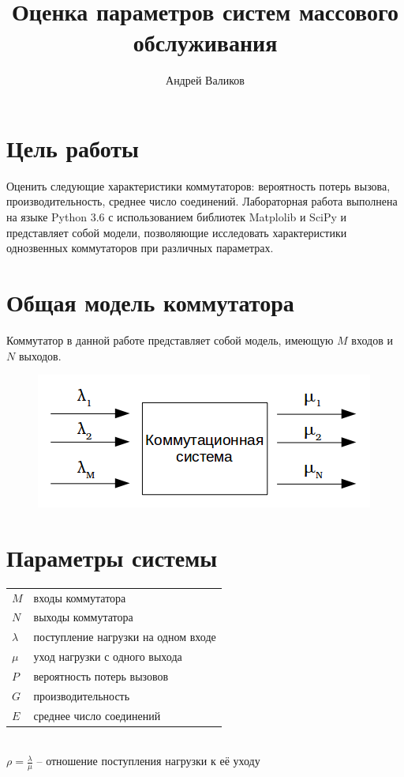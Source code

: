 \documentclass[12pt]{article}
\let\Oldsection\section
\renewcommand{\section}{\FloatBarrier\Oldsection}
\begin{document}
\title{Оценка параметров систем массового обслуживания}
\author{Андрей Валиков}
\date{}
\maketitle

\section{Цель работы}
Оценить следующие характеристики коммутаторов: вероятность потерь вызова, производительность, среднее число соединений. Лабораторная работа выполнена на языке Python 3.6 с использованием библиотек Matplolib и SciPy и представляет собой модели, позволяющие исследовать характеристики однозвенных коммутаторов при различных параметрах.

\section{Общая модель коммутатора}
Коммутатор в данной работе представляет собой модель, имеющую $M$ входов и $N$ выходов.

\begin{figure}[htp]
\centering
\includegraphics[scale=1.00]{assets/comm_model.png}
\end{figure}


\section{Параметры системы}\label{sec:systemParams}

\begin{tabular}{l l}
    $M$ & входы коммутатора \\
    $N$ & выходы коммутатора \\
    $\lambda$ & поступление нагрузки на одном входе \\
    $\mu$ & уход нагрузки с одного выхода \\
    $P$ & вероятность потерь вызовов \\
    $G$ & производительность \\
    $E$ & среднее число соединений \\
\end{tabular} \\
    $\rho = \frac{\lambda}{\mu}$ -- отношение поступления нагрузки к её уходу 
\end{document}
